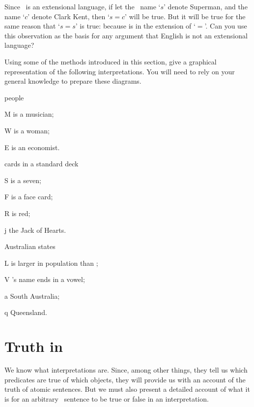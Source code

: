 \practiceproblems
\problempart
Since \FOL\ is an extensional language, if let the \FOL\ name `$s$' denote Superman, and the name `$c$' denote Clark Kent, then `$s=c$' will be true. But it will be true for the same reason that `$s=s$' is true: because  is in the extension of `$=$'. Can you use this observation as the basis for any argument that English is not an extensional language?

\problempart
Using some of the methods introduced in this section, give a graphical representation of the following interpretations. You will need to rely on your general knowledge to prepare these diagrams. \begin{earg}
	\item \begin{ekey}
		\item[\text{domain}] people
		\item[M]  is a musician;
		\item[W]  is a woman;
		\item[E]  is an economist.
	\end{ekey}
	\item \begin{ekey}
\item[\text{domain}] cards in a standard deck
\item[S]  is a seven;
\item[F]  is a face card;
\item[R]  is red;
\item[j] the Jack of Hearts.
	\end{ekey}
	\item \begin{ekey}
		\item[\text{domain}] Australian states
		\item[L]  is larger in population than \gap{2};
		\item[V] 's name ends in a vowel;
		\item[a] South Australia;
		\item[q] Queensland.
	\end{ekey}
\end{earg}

\chapter{Truth in \textnormal{\FOL}}\label{s:TruthFOL}
We know what interpretations are. Since, among other things, they tell us which predicates are true of which objects, they will provide us with an account of the truth of atomic sentences. But we must also present a detailed account of what it is for an arbitrary \FOL\ sentence to be true or false in an interpretation. 


